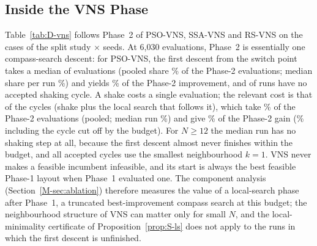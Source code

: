 \documentclass[10pt]{article}
\begin{document}
\subsection{Inside the VNS Phase}
\label{sec:S-diag-vns}
Table~\ref{tab:D-vns} follows Phase~2 of PSO-VNS, SSA-VNS and RS-VNS on the \NDVnsCases{} cases of the split study $\times$ \NDVnsSeeds{} seeds. At 6,030 evaluations, Phase~2 is essentially one compass-search descent: for PSO-VNS, the first descent from the switch point takes a median of \NDDescentEvalsPSOVNS{} evaluations (pooled share \NDDescentEvalsPctPSOVNS\% of the Phase-2 evaluations; median share per run \NDDescentEvalsPctMedianPSOVNS\%) and yields \NDDescentSharePSOVNS\% of the Phase-2 improvement, and \NDNoAcceptedPSOVNS{} of \NDVnsRunsPSOVNS{} runs have no accepted shaking cycle. A shake costs a single evaluation; the relevant cost is that of the cycles (shake plus the local search that follows it), which take \NDCycleEvalsPctPSOVNS\% of the Phase-2 evaluations (pooled; median run \NDCycleEvalsPctMedianPSOVNS\%) and give \NDCycleSharePSOVNS\% of the Phase-2 gain (\NDCycleAllSharePSOVNS\% including the cycle cut off by the budget). %
For $N\ge12$ the median run has no shaking step at all, because the first descent almost never finishes within the budget, and all accepted cycles use the smallest neighbourhood $k=1$. %
VNS never makes a feasible incumbent infeasible, and its start is always the best feasible Phase-1 layout when Phase~1 evaluated one. %
The component analysis (Section~\ref{M-sec:ablation}) therefore measures the value of a local-search phase after Phase~1, a truncated best-improvement compass search at this budget; the neighbourhood structure of VNS can matter only for small $N$, and the local-minimality certificate of Proposition~\ref{prop:S-ls} does not apply to the runs in which the first descent is unfinished.
\end{document}
